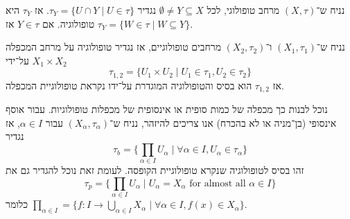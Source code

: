 \begin{proposition}
	נניח ש־$(X, \tau)$ מרחב טופולוגי, לכל $\emptyset \ne Y \subseteq X$ נגדיר $\tau_Y = \{ U \cap Y \mid U \in \tau \}$.
	אז $\tau_Y$ היא טופולוגיה.
	אם $Y \in \tau$ אז $\tau_Y = \{ W \in \tau \mid W \subseteq Y \}$.
\end{proposition}
\begin{proposition}
	נניח ש־$(X_1, \tau_1)$ ו־$(X_2, \tau_2)$ מרחבים טופולוגיים, אז נגדיר טופולוגיה על מרחב המכפלה $X_1 \times X_2$ על־ידי
	\[
		\tau_{1, 2}
		= \{ U_1 \times U_2 \mid U_1 \in \tau_1, U_2 \in \tau_2 \}
	\]
	אז $\tau_{1, 2}$ הוא בסיס והטופולוגיה המוגדרת על־ידו נקראת טופולוגיית המכפלה.
\end{proposition}
\begin{example}
	נוכל לבנות כך מכפלה של כמות סופית או אינסופית של מכפלות טופולוגיות.
	עבור אוסף אינסופי (בן־מניה או לא בהכרח) אנו צריכים להיזהר, נניח ש־$(X_\alpha, \tau_\alpha)$ עבור $\alpha \in I$, אז נגדיר
	\[
		\tau_b = \{ \prod_{\alpha \in I} U_\alpha \mid \forall \alpha \in I, U_\alpha \in \tau_\alpha \}
	\]
	זהו בסיס לטופולוגיה שנקרא טופולוגיית הקופסה.
	לעומת זאת נוכל להגדיר גם את
	\[
		\tau_p
		= \{ \prod_{\alpha \in I} U_\alpha \mid U_\alpha = X_\alpha \text{ for almost all } \alpha \in I \}
	\]
	כלומר $\prod_{\alpha \in I} = \{ f : I \to \bigcup_{\alpha \in I} X_\alpha \mid \forall \alpha \in I, f(x) \in X_\alpha \}$.
\end{example}

\listoftheorems[title=הגדרות ומשפטים,ignoreall,show={theorem,definition},swapnumber,onlynamed={proposition}]


